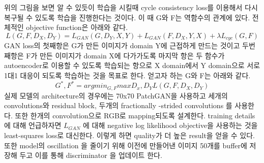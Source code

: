 \documentclass[extendedabs]{bmvc2k}
\begin{document}
 \newline 위의 그림을 보면 알 수 있듯이 학습을 시킬때 cycle consistency loss를 이용해서 다시 복구될 수 있도록 학습을 진행한다는 것이다.
 이 때 G와 F는 역함수의 관계에 있다. 전체적인 objective function은 아래와 같다.
 $$ L(G,F,D_X,D_Y) = L_{GAN}(G,D_Y,X,Y) + L_{GAN}(F,D_X,Y,X) + \lambda L_{cyc}(G,F) $$
 GAN loss의 첫째항은 G가 만든 이미지가 domain Y에 근접하게 만드는 것이고 두번째항은 F가 만든 이미지가 domain X에 다가가도록 
 마지막 항은 두 함수가 autoencoder로 이용할 수 있도록 학습되는 항으로 X domain에서 Y domain으로 서로 1대1 대응이 되도록 학습하는 것을 목표로 한다.
 얻고자 하는 G와 F는 아래와 같다.
 $$ G^*, F^* =argmin_{G,F} max{D_x,D_Y} L(G,F,D_X,D_Y) $$
 실제 모델의 architecture의 경우에는 70x70 PatchGAN을 사용하고 세개의 convolutions와 residual block, 두개의 fractionally -strided convolutions 를 사용한다. 
 또한 한개의 convolution으로 RGB로 mapping되도록 설계한다. training details에 대해 언급하자면 $L_{GAN}$ 에 대해 negative log likelihood objective을 사용하는 것을
 least-squares loss로 대신한다. 이렇게 하면 quality가 더 높은 result을 얻을 수 있다. 또한  model의 oscillation 을 줄이기 위해 이전에 만들어낸 이미지 50개를 buffer에 저장해 두고
 이를 통해 discriminator 을 업데이트 한다.
\end{document}
